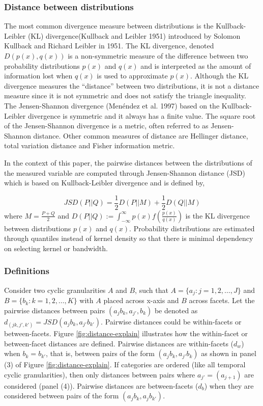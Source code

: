 \documentclass[
]{article}
\begin{document}
\hypertarget{distance-between-distributions}{%
\subsubsection{Distance between distributions}\label{distance-between-distributions}}

The most common divergence measure between distributions is the Kullback-Leibler (KL) divergence(Kullback and Leibler 1951) introduced by Solomon Kullback and Richard Leibler in 1951. The KL divergence, denoted \(D(p(x), q(x))\) is a non-symmetric measure of the difference between two probability distributions \(p(x)\) and \(q(x)\) and is interpreted as the amount of information lost when \(q(x)\) is used to approximate \(p(x)\). Although the KL divergence measures the ``distance'' between two distributions, it is not a distance measure since it is not symmetric and does not satisfy the triangle inequality. The Jensen-Shannon divergence (Menéndez et al. 1997) based on the Kullback-Leibler divergence is symmetric and it always has a finite value. The square root of the Jensen-Shannon divergence is a metric, often referred to as Jensen-Shannon distance. Other common measures of distance are Hellinger distance, total variation distance and Fisher information metric.

In the context of this paper, the pairwise distances between the distributions of the measured variable are computed through Jensen-Shannon distance (JSD) which is based on Kullback-Leibler divergence and is defined by,

\[JSD(P||Q) = \frac{1}{2}D(P||M) + \frac{1}{2}D(Q||M)\]
where \(M = \frac{P+Q}{2}\) and
\(D(P||Q) := \int^\infty_{-\infty} p(x)f(\frac{p(x)}{q(x)})\) is the KL divergence between distributions \(p(x)\) and \(q(x)\). Probability distributions are estimated through quantiles instead of kernel density so that there is minimal dependency on selecting kernel or bandwidth.

\hypertarget{definitions}{%
\subsubsection{Definitions}\label{definitions}}

Consider two cyclic granularities \(A\) and \(B\), such that \(A = \{ a_j: j = 1, 2, \dots, J\}\) and \(B = \{ b_k: k = 1, 2, \dots, K\}\) with \(A\) placed across x-axis and \(B\) across facets. Let the pairwise distances between pairs \((a_{j} b_{k}, a_{j'}, b_{k})\) be denoted as \(d_{(jk, j', k')} = JSD(a_{j}b_{k}, a_{j'}b_{k'})\). Pairwise distances could be within-facets or between-facets. Figure \ref{fig:distance-explain} illustrates how the within-facet or between-facet distances are defined. Pairwise distances are within-facets (\(d_{w}\)) when \(b_{k} = b_{k'}\), that is, between pairs of the form \((a_{j}b_{k}, a_{j'}b_{k})\) as shown in panel (3) of Figure \ref{fig:distance-explain}. If categories are ordered (like all temporal cyclic granularities), then only distances between pairs where \(a_{j'} = (a_{j+1})\) are considered (panel (4)). Pairwise distances are between-facets (\(d_{b}\)) when they are considered between pairs of the form \((a_{j}b_{k}, a_{j}b_{k'})\).
\end{document}
